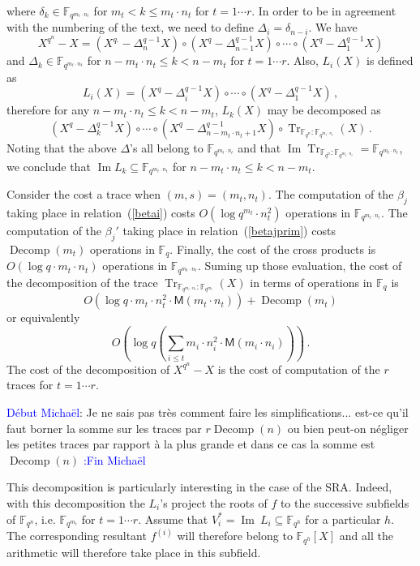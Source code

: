 \documentclass{sig-alternate}
\newcommand{\ff}[1]{\mathbb{F}_{#1}}
\newcommand{\qq}{q}
\newcommand{\nn}{n}
\newcommand{\qn}{{\qq^\nn}}
\newcommand{\basef}{\ff{\qq}}
\newcommand{\extf}{\ff{\qn}}
\DeclareMathOperator{\Tr}{Tr}
\DeclareMathOperator{\Ima}{Im}
\DeclareMathOperator{\Decomp}{Decomp}
\newcommand{\tr}[2]{\Tr_{\ff{#1}:\ff{#2}}}
\newcommand{\bigO}{O}
\newcommand{\Mul}{\mathsf{M}}
\newcommand{\comd}{\noindent \textcolor{blue}{D\'ebut Micha\"el}:}
\newcommand{\comf}{\noindent \textcolor{blue}{:Fin Micha\"el}}
\begin{document}
where $\delta_k \in \mathbb{F}_{\qq^{m_t \cdot n_t}}$ for $m_{t}  < k \le m_t \cdot n_t$ for $t=1 \cdots r$. In order to be in agreement with the numbering of the text, we need to define $\Delta_i=\delta_{n-i}$.
We have
$$X^{\qq^{\nn}}-X=(X^{\qq.} -\Delta_n^{\qq-1} X ) \circ (X^{\qq} -\Delta_{n-1}^{\qq-1} X ) \circ \cdots \circ (X^{\qq} -\Delta_1^{\qq-1} X )$$
and $\Delta_k \in \mathbb{F}_{\qq^{m_t \cdot n_t}}$ for $n-m_{t} \cdot n_t  \le  k < n- m_{t}$ for $t=1 \cdots r$.
Also, $L_i(X)$ is defined as 
$$L_i(X)= (X^q-\Delta_i^{q-1} X) \circ \cdots \circ (X^q-\Delta_1^{q-1} X)\,,$$
therefore for any $n-m_t \cdot n_t \le k < n-m_{t}$, $L_k(X)$ may be decomposed as
$$(X^q-\Delta_k^{q-1}X) \circ \cdots \circ (X^q-\Delta_{n-m_t \cdot n_t+1}^{q-1}X) \circ  \tr{\qq^{n}}{\qq^{m_t \cdot n_t}}(X)\,.$$
Noting that the above $\Delta$'s all belong to $\mathbb{F}_{\qq^{m_t \cdot n_t}}$ and that $\Ima \tr{\qq^{n}}{\qq^{m_t \cdot n_t}}=\mathbb{F}_{\qq^{m_t \cdot n_t}}$, we conclude that $\Ima L_k \subseteq \mathbb{F}_{\qq^{m_t \cdot n_t}}$ for $n-m_{t} \cdot n_t  \le  k < n- m_{t}$.

\medskip

 Consider the cost a trace when $(m,s)=(m_{t},n_t)$. The computation of the $\beta_j$ taking place in relation~(\ref{betai}) costs $\bigO(\log q^{m_{t}} \cdot n_t^2)$ operations in $\mathbb{F}_{\qq^{m_t \cdot n_t}}$. The computation of the $\beta_j'$ taking place in relation~(\ref{betajprim}) costs $\Decomp(m_t)$ operations in $\basef$. Finally, the cost of the cross products is $\bigO(\log q \cdot  m_{t} \cdot n_t)$ operations in $\mathbb{F}_{\qq^{m_t \cdot n_t}}$. Suming up those evaluation, the cost of the decomposition of the trace $\tr{\qq^{m_t \cdot n_t}}{\qq^{m_t}}(X)$ in terms of operations in $\basef$ is 
$$\bigO(\log q\cdot m_t \cdot n_t^2 \cdot \Mul(m_t \cdot n_t)) + \Decomp(m_t)$$
or equivalently
$$\bigO\left(\log q \left(\sum_{i \le t} m_i \cdot n_i^2 \cdot \Mul(m_i \cdot n_i) \right) \right)\,.$$
The cost of the decomposition of $X^{\qq^\nn}-X$ is the cost of computation of the $r$ traces for $t=1 \cdots r$. 

\comd
Je ne sais pas tr\`es comment faire les simplifications... est-ce qu'il faut borner la somme sur les traces par $r \Decomp(\nn)$ ou bien peut-on n\'egliger les petites traces par rapport \`a la plus grande et dans ce cas la somme est $\Decomp(\nn)$ 
\comf

\medskip

 This decomposition is particularly interesting in the case of the SRA. Indeed, with this decomposition the $L_i$'s project the roots of $f$ to the successive subfields of $\extf$, i.e.  $\mathbb{F}_{\qq^{m_t}}$ for $t=1 \cdots r$.
 Assume that $V_i^\ast=\Ima~L_i \subseteq \mathbb{F}_{\qq^h}$ for a particular $h$. The corresponding resultant $f^{(i)}$ will therefore belong to $\mathbb{F}_{\qq^h}[X]$ and all the arithmetic will therefore take place in this subfield.
  
\end{document}
